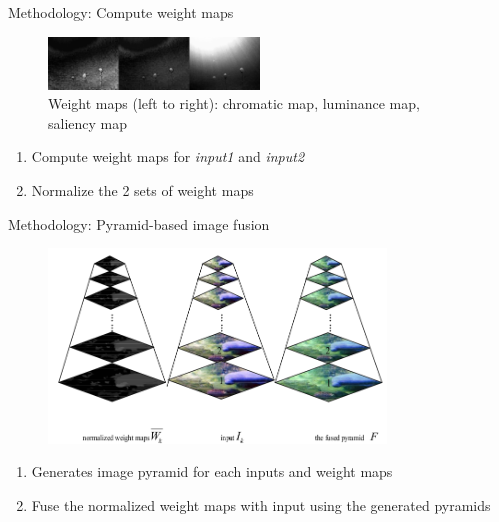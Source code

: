 \documentclass[14pt]{beamer}
\begin{document}
\begin{frame}{Methodology: Compute weight maps}

  \begin{figure}[ht]
      \centering
      \includegraphics[width=0.5\textwidth, height=0.2\textwidth]{figs/weightmaps.png}
      \caption{Weight maps (left to right): chromatic map, luminance map,
        saliency map}
  \end{figure}

  \begin{enumerate}
    \item Compute weight maps for \textit{input1} and \textit{input2}
    \item Normalize the 2 sets of weight maps
  \end{enumerate}
\end{frame}

\begin{frame}{Methodology: Pyramid-based image fusion}

  \begin{figure}[ht]
      \centering
      \includegraphics[width=0.8\textwidth, height=0.4\textwidth]{figs/pyramid.png}
  \end{figure}

  \begin{enumerate}
    \item Generates image pyramid for each inputs and weight maps
    \item Fuse the normalized weight maps with input  using the generated pyramids
  \end{enumerate}
\end{frame}
\end{document}
